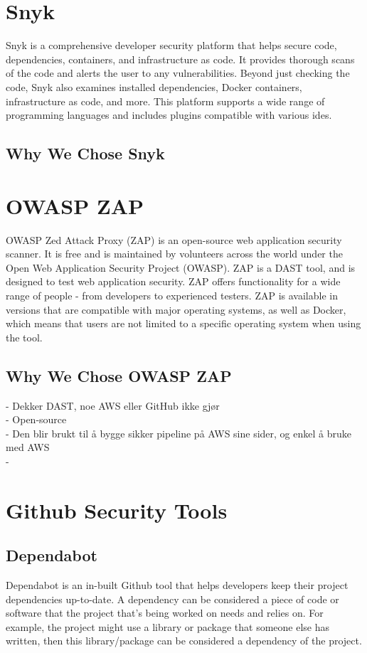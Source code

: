 \section{Snyk}
Snyk is a comprehensive developer security platform that helps secure code, dependencies, containers, and infrastructure as code. It provides thorough scans of the code and alerts the user to any vulnerabilities. Beyond just checking the code, Snyk also examines installed dependencies, Docker containers, infrastructure as code, and more. This platform supports a wide range of programming languages and includes plugins compatible with various \acrlong{ide}s.\cite{snyk}
\subsection{Why We Chose Snyk}

\section{OWASP ZAP}
OWASP Zed Attack Proxy (ZAP) is an open-source web application security scanner. It is free and is maintained by volunteers across the world under the Open Web Application Security Project (OWASP). ZAP is a DAST tool, and is designed to test web application security. ZAP offers functionality for a wide range of people - from developers to experienced testers. ZAP is available in versions that are compatible with major operating systems, as well as Docker, which means that users are not limited to a specific operating system when using the tool.\cite{owaspZAP}

\subsection{Why We Chose OWASP ZAP}
- Dekker DAST, noe AWS eller GitHub ikke gjør \\
- Open-source \\
- Den blir brukt til å bygge sikker pipeline på AWS sine sider, og enkel å bruke med AWS \\
- 


\section{Github Security Tools}

\subsection{Dependabot}
Dependabot is an in-built Github tool that helps developers keep their project dependencies up-to-date. A dependency can be considered a piece of code or software that the project that's being worked on needs and relies on. For example, the project might use a library or package that someone else has written, then this library/package can be considered a dependency of the project. 

